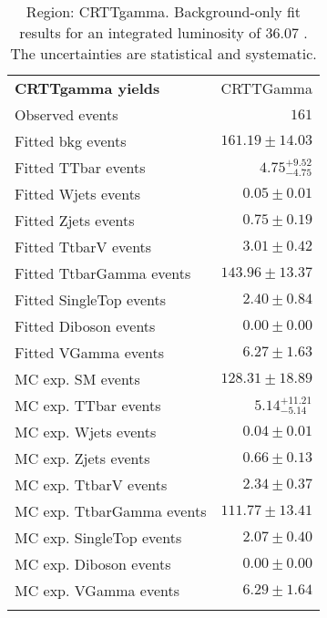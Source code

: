 

\begin{table}
\begin{center}
\setlength{\tabcolsep}{0.0pc}
{\small
\begin{tabular*}{\textwidth}{@{\extracolsep{\fill}}lr}
\noalign{\smallskip}\hline\noalign{\smallskip}
{\bf CRTTgamma yields}           & CRTTGamma              \\[-0.05cm]
\noalign{\smallskip}\hline\noalign{\smallskip}
Observed events          & $161$                    \\
\noalign{\smallskip}\hline\noalign{\smallskip}
Fitted bkg events         & $161.19 \pm 14.03$              \\
\noalign{\smallskip}\hline\noalign{\smallskip}
        Fitted TTbar events         & $4.75_{-4.75}^{+9.52}$              \\
        Fitted Wjets events         & $0.05 \pm 0.01$              \\
        Fitted Zjets events         & $0.75 \pm 0.19$              \\
        Fitted TtbarV events         & $3.01 \pm 0.42$              \\
        Fitted TtbarGamma events         & $143.96 \pm 13.37$              \\
        Fitted SingleTop events         & $2.40 \pm 0.84$              \\
        Fitted Diboson events         & $0.00 \pm 0.00$              \\
        Fitted VGamma events         & $6.27 \pm 1.63$              \\
 \noalign{\smallskip}\hline\noalign{\smallskip}
MC exp. SM events              & $128.31 \pm 18.89$              \\
\noalign{\smallskip}\hline\noalign{\smallskip}
        MC exp. TTbar events         & $5.14_{-5.14}^{+11.21}$              \\
        MC exp. Wjets events         & $0.04 \pm 0.01$              \\
        MC exp. Zjets events         & $0.66 \pm 0.13$              \\
        MC exp. TtbarV events         & $2.34 \pm 0.37$              \\
        MC exp. TtbarGamma events         & $111.77 \pm 13.41$              \\
        MC exp. SingleTop events         & $2.07 \pm 0.40$              \\
        MC exp. Diboson events         & $0.00 \pm 0.00$              \\
        MC exp. VGamma events         & $6.29 \pm 1.64$              \\
\noalign{\smallskip}\hline\noalign{\smallskip}
\end{tabular*}
}
\end{center}
\caption{Region: CRTTgamma. Background-only fit results for an integrated luminosity of 36.07 \ifb. The uncertainties are statistical and systematic.
}
\label{table.bkgonly.CRTTgamma}
\end{table}
%